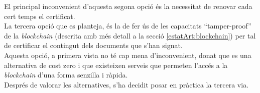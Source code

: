 \newline El principal inconvenient d'aquesta segona opció és la necessitat de renovar cada cert temps el certificat.\\
\newline La tercera opció que es planteja, és la de fer ús de les capacitats ``tamper-proof'' de la \textit{blockchain} (descrita amb més detall a la secció \ref{estatArt:blockchain}) per tal de certificar el contingut dels documents que s'han signat.\\
\newline Aquesta opció, a primera vista no té cap mena d'inconvenient, donat que es una alternativa de cost zero i que existeixen serveis que permeten l'accés a la \textit{blockchain} d'una forma senzilla i ràpida.\\
\newline Després de valorar les alternatives, s'ha decidit posar en pràctica la tercera via.

